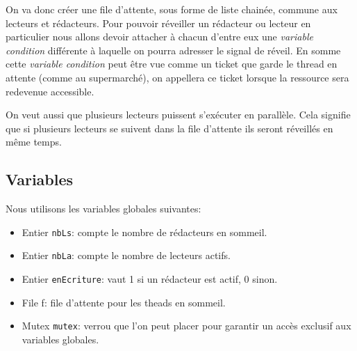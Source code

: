 \documentclass[11pt]{article}
\theoremstyle{definition}
\theoremstyle{definition}
\begin{document}
On va donc créer une file d'attente, sous forme de liste chainée, commune aux lecteurs et rédacteurs. Pour pouvoir réveiller un rédacteur ou lecteur en particulier nous allons devoir attacher à chacun d'entre eux une \textit{variable condition} différente à laquelle on pourra adresser le signal de réveil. En somme cette \textit{variable condition} peut être vue comme un ticket que garde le thread en attente (comme au supermarché), on appellera ce ticket lorsque la ressource sera redevenue accessible.

On veut aussi que plusieurs lecteurs puissent s'exécuter en parallèle. Cela signifie que si plusieurs lecteurs se suivent dans la file d'attente ils seront réveillés en même temps.

\subsection{Variables}
Nous utilisons les variables globales suivantes:

\begin{itemize}
\item Entier \texttt{nbLs}: compte le nombre de rédacteurs en sommeil.
\item Entier \texttt{nbLa}: compte le nombre de lecteurs actifs.
\item Entier \texttt{enEcriture}: vaut 1 si un rédacteur est actif, 0 sinon.
\item File f: file d'attente pour les theads en sommeil.
\item Mutex \texttt{mutex}: verrou que l'on peut placer pour garantir un accès exclusif aux variables globales.
\end{itemize}
\end{document}
